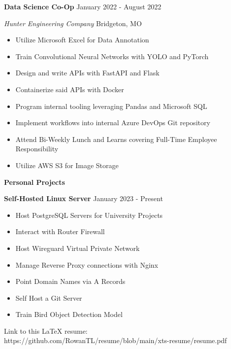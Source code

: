 \documentclass[11pt]{article}
\begin{document}
\textbf{Data Science Co-Op} \hfill January 2022 - August 2022

\textsl{Hunter Engineering Company} \hfill Bridgeton, MO
\begin{itemize}[noitemsep]
    \item Utilize Microsoft Excel for Data Annotation
    \item Train Convolutional Neural Networks with YOLO and PyTorch
    \item Design and write APIs with FastAPI and Flask
    \item Containerize said APIs with Docker
    \item Program internal tooling leveraging Pandas and Microsoft SQL
    \item Implement workflows into internal Azure DevOps Git repository
    \item Attend Bi-Weekly Lunch and Learns covering Full-Time Employee Responsibility
    \item Utilize AWS S3 for Image Storage
\end{itemize}

\begin{center}
    \textbf{Personal Projects}
\end{center}

\textbf{Self-Hosted Linux Server} \hfill January 2023 - Present
\begin{itemize}[noitemsep]
    \item Host PostgreSQL Servers for University Projects
    \item Interact with Router Firewall
    \item Host Wireguard Virtual Private Network
    \item Manage Reverse Proxy connections with Nginx
    \item Point Domain Names via A Records
    \item Self Host a Git Server
    \item Train Bird Object Detection Model
\end{itemize}

\tiny{Link to this LaTeX resume: https://github.com/RowanTL/resume/blob/main/xts-resume/resume.pdf}
\end{document}
